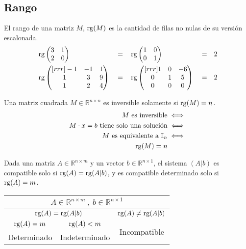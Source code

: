 \documentclass[../teoria.root.tex]{subfiles}
\begin{document}
\subsection{Rango}

El rango de una matriz $M$, $\operatorname{rg}(M)$ es la cantidad de filas no nulas de su
versión escalonada.
\begin{align*}
	&\operatorname{rg}\begin{pmatrix}
		3 & 1 \\
		2 & 0
	\end{pmatrix}&&=&&\operatorname{rg}\begin{pmatrix}
		1 & 0 \\
		0 & 1
	\end{pmatrix}&&=&&2\\
	&\operatorname{rg}\begin{pmatrix}[rrr]
		-1 & -1 & 1 \\
		 1 &  3 & 9 \\
		 1 &  2 & 4
	\end{pmatrix}&&=&&\operatorname{rg}\begin{pmatrix}[rrr]
		1 & 0 & -6 \\
		0 & 1 &  5 \\
		0 & 0 &  0
	\end{pmatrix}&&=&&2
\end{align*}

Una matriz cuadrada $M\in\mathbb{R}^{n\times n}$ es inversible solamente si
$\operatorname{rg}(M)=n$.
\begin{align*}
	M\text{ es inversible}&\iff\\
	M\cdot x=b\text{ tiene solo una solución}&\iff\\
	M\text{ es equivalente a }\mathbb{I}_n&\iff\\
	\operatorname{rg}(M)=n
\end{align*}

Dada una matriz $A\in\mathbb{R}^{n\times m}$ y un vector
$b\in\mathbb{R}^{n\times 1}$, el sistema $(A|b)$ es compatible solo si
$\operatorname{rg}(A)=\operatorname{rg}(A|b)$, y es compatible determinado solo si $\operatorname{rg}(A)=m$.

\begin{center}
	\begin{tabular}{ccc}
		\toprule
		\multicolumn{3}{c}{$A\in\mathbb{R}^{n\times m}\:,\: b\in\mathbb{R}^{n\times 1}$} \\
		\midrule
		\multicolumn{2}{c}{$\operatorname{rg}(A)=\operatorname{rg}(A|b)$} & $\operatorname{rg}(A)\neq\operatorname{rg}(A|b)$ \\
		\midrule
		$\operatorname{rg}(A)=m$ & $\operatorname{rg}(A)<m$ & \multirow{2}{*}{Incompatible} \\
		Determinado & Indeterminado \\
		\bottomrule
	\end{tabular}
\end{center}
\end{document}
